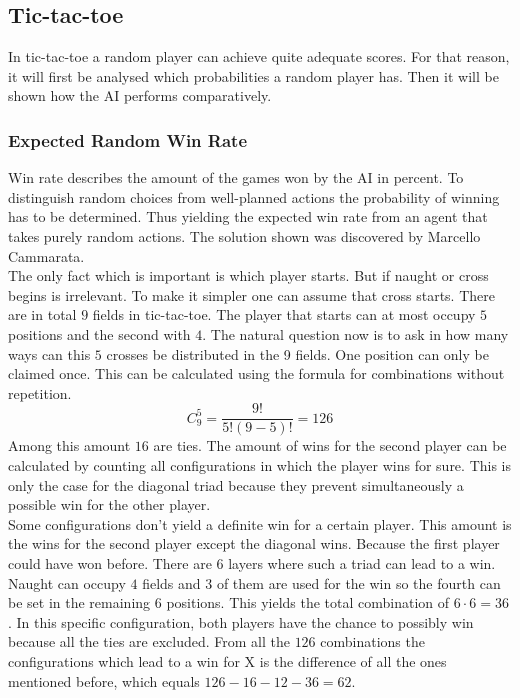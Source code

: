 \documentclass[12pt]{article}
\begin{document}
\subsection{Tic-tac-toe}
In tic-tac-toe a random player can achieve quite adequate scores. For that reason, it will first be analysed which probabilities a random player has. Then it will be shown how the AI performs comparatively.
\subsubsection{Expected Random Win Rate}
Win rate describes the amount of the games won by the \gls{AI} in percent.
To distinguish random choices from well-planned actions the probability of winning has to be determined. Thus yielding the expected win rate from an agent that takes purely random actions.
The solution shown was discovered by Marcello Cammarata.  \cite{tic_tac_toe_prob} 
\\ The only fact which is important is which player starts. But if naught or cross begins is irrelevant. To make it simpler one can assume that cross starts. There are in total $9$ fields in tic-tac-toe. The player that starts can at most occupy $5$ positions and the second with $4$. The natural question now is to ask in how many ways can this $5$ crosses be distributed in the 9 fields. One position can only be claimed once. This can be calculated using the formula for combinations without repetition.\cite{comb}
\begin{equation}\nonumber
    C^{5}_{9} = \frac{9!}{5!(9-5)!} = 126
\end{equation}
Among this amount $16$ are ties. The amount of wins for the second player can be calculated by counting all configurations in which the player wins for sure. This is only the case for the diagonal triad because they prevent simultaneously a possible win for the other player. \\
Some configurations don't yield a definite win for a certain player. This amount is the wins for the second player except the diagonal wins. Because the first player could have won before. There are $6$ layers where such a triad can lead to a win. Naught can occupy $4$ fields and $3$ of them are used for the win so the fourth can be set in the remaining $6$ positions. This yields the total combination of $6 \cdot 6 = 36$. In this specific configuration, both players have the chance to possibly win because all the ties are excluded.
From all the $126$ combinations the configurations which lead to a win for X is the difference of all the ones mentioned before, which equals $126 -  16 - 12 - 36 = 62 $.\\
\end{document}
